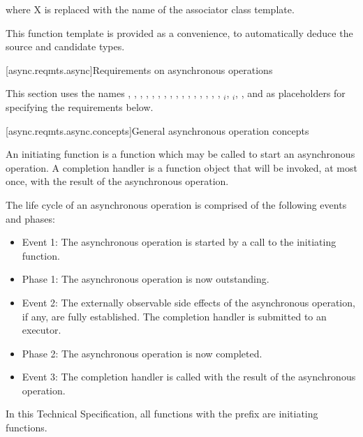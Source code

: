where X is replaced with the name of the associator class template. \begin{note} This function template is provided as a convenience, to automatically deduce the source and candidate types. \end{note}



[async.reqmts.async]{Requirements on asynchronous operations}

\pnum
This section uses the names , , , , , , , , , , , , , , , , $_i$, $_i$, , and  as placeholders for specifying the requirements below.


[async.reqmts.async.concepts]{General asynchronous operation concepts}

\pnum
An initiating function is a function which may be called to start an asynchronous operation. A completion handler is a function object that will be invoked, at most once, with the result of the asynchronous operation.

\pnum
 The life cycle of an asynchronous operation is comprised of the following events and phases:

\begin{itemize}
\item
Event 1: The asynchronous operation is started by a call to the initiating function.

\item
Phase 1: The asynchronous operation is now outstanding.

\item
Event 2: The externally observable side effects of the asynchronous operation, if any, are fully established. The completion handler is submitted to an executor.

\item
Phase 2: The asynchronous operation is now completed.

\item
Event 3: The completion handler is called with the result of the asynchronous operation.
\end{itemize}

\pnum
In this Technical Specification, all functions with the prefix  are initiating functions.



